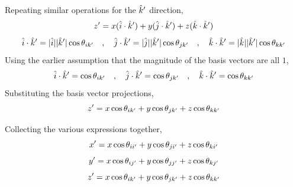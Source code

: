 \documentclass[class=report, 12pt, crop=false]{standalone}
\begin{document}
\begin{center}
Repeating similar operations for the $\hat{k}'$ direction,
$$z' = x(\hat{i}\cdot\hat{k}') + y(\hat{j}\cdot\hat{k}') + z(\hat{k}\cdot\hat{k}')$$
$$\hat{i}\cdot\hat{k}' = |\hat{i}||\hat{k}'|\cos\theta_{ik'} \quad,\quad \hat{j}\cdot\hat{k}' = |\hat{j}||\hat{k}'|\cos\theta_{jk'} \quad,\quad \hat{k}\cdot\hat{k}' = |\hat{k}||\hat{k}'|\cos\theta_{kk'}$$
Using the earlier assumption that the magnitude of the basis vectors are all $1$,
$$\hat{i}\cdot\hat{k}' = \cos\theta_{ik'} \quad,\quad \hat{j}\cdot\hat{k}' = \cos\theta_{jk'} \quad,\quad \hat{k}\cdot\hat{k}' = \cos\theta_{kk'}$$
Substituting the basis vector projections,
$$z' = x\cos\theta_{ik'} + y\cos\theta_{jk'} + z\cos\theta_{kk'}$$

Collecting the various expressions together,
$$x' = x\cos\theta_{ii'} + y\cos\theta_{ji'} + z\cos\theta_{ki'}$$
$$y' = x\cos\theta_{ij'} + y\cos\theta_{jj'} + z\cos\theta_{kj'}$$
$$z' = x\cos\theta_{ik'} + y\cos\theta_{jk'} + z\cos\theta_{kk'}$$


\end{center}
\end{document}
